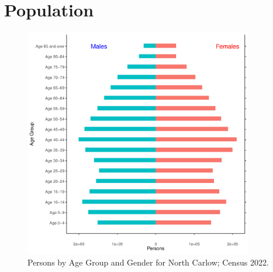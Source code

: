 \documentclass{article}
\begin{document}
\pagebreak

\section{Population} 
\label{sect:Pop}

\begin{figure}[h]
	\centering
	\includegraphics[width = 100mm]{../figures/PyramidPlot.pdf}
	\caption{Persons by Age Group and Gender for North Carlow; Census 2022.}
	\label{fig:2ae19629-1a6a-13a3-e055-000000000001}
	\end{figure}
\end{document}
